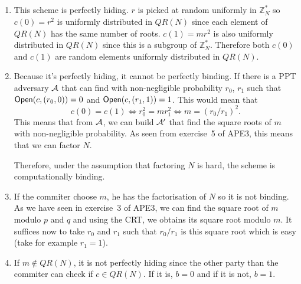 \subsection{}
\begin{solution}
  \begin{enumerate}
    \item
      This scheme is perfectly hiding.
      $r$ is picked at random uniformly in $\mathbb{Z}_N^*$
      so $c(0) = r^{2}$ is uniformly distributed in $QR(N)$ since each element of $QR(N)$ has the same number of roots.
      $c(1) = mr^{2}$ is also uniformly distributed in $QR(N)$
      since this is a subgroup of $\mathbb{Z}_N^*$.
      Therefore both $c(0)$ and $c(1)$ are random elements uniformly distributed in $QR(N)$.
    \item
      Because it's perfectly hiding, it cannot be perfectly binding.
      If there is a PPT adversary $\mathcal{A}$ that can find with non-negligible probability
      $r_{0}$, $r_{1}$ such that $\operatorname{\mathsf{Open}}(c, (r_{0}, 0))=0$ and
      $\operatorname{\mathsf{Open}}(c, (r_{1}, 1))=1$. This would mean that
      \[ c(0)=c(1) \Leftrightarrow r_{0}^{2}=mr_{1}^{2} \Leftrightarrow m=(r_{0}/r_{1})^{2}. \]
      This means that from $\mathcal{A}$, we can build $\mathcal{A}'$ that find the square roots of $m$ with non-negligible probability.
      As seen from exercise~5 of APE3, this means that we can factor $N$.

      Therefore, under the assumption that factoring $N$ is hard, the scheme is computationally binding.
    \item
      If the commiter choose $m$, he has the factorisation of $N$ so it is not binding.
      As we have seen in exercise~3 of APE3, we can find the square root of $m$ modulo $p$ and $q$
      and using the CRT, we obtains its square root modulo $m$.
      It suffices now to take $r_0$ and $r_1$ such that $r_{0}/r_{1}$ is this square root which is easy (take for example $r_1 = 1$).
    \item
      If $m \not\in QR(N)$, it is not perfectly hiding since the other party than the commiter can
      check if $c \in QR(N)$.
      If it is, $b = 0$ and if it is not, $b = 1$.


\end{enumerate}
\end{solution}
